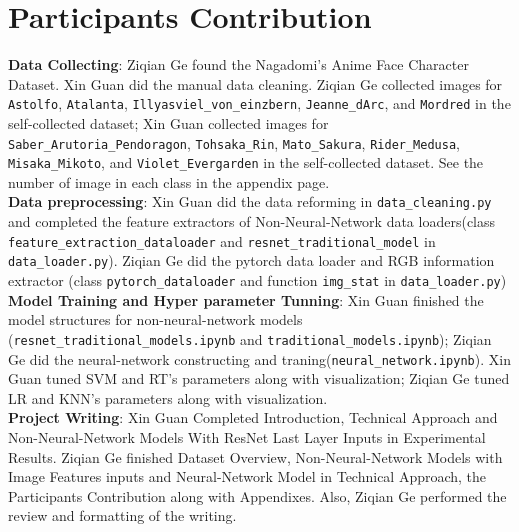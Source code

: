 \documentclass[11.5pt]{article}
\begin{document}
    \section{Participants Contribution}
    \textbf{Data Collecting}: Ziqian Ge found the Nagadomi's Anime Face Character Dataset. Xin Guan did the manual data cleaning. Ziqian Ge collected images for \texttt{Astolfo}, \texttt{Atalanta}, \texttt{Illyasviel\_von\_einzbern}, \texttt{Jeanne\_dArc}, and \texttt{Mordred} in the self-collected dataset; Xin Guan collected images for \texttt{Saber\_Arutoria\_Pendoragon}, \texttt{Tohsaka\_Rin}, \texttt{Mato\_Sakura}, \texttt{Rider\_Medusa}, \texttt{Misaka\_Mikoto}, and \texttt{Violet\_Evergarden} in the self-collected dataset. See the number of image in each class in the appendix page.\\
    \textbf{Data preprocessing}: Xin Guan did the data reforming in \texttt{data\_cleaning.py} and completed the feature extractors of Non-Neural-Network data loaders(class \texttt{feature\_extraction\_dataloader} and \texttt{resnet\_traditional\_model} in \texttt{data\_loader.py}). Ziqian Ge did the pytorch data loader and RGB information extractor (class \texttt{pytorch\_dataloader} and function \texttt{img\_stat} in \texttt{data\_loader.py}) \\
    \textbf{Model Training and Hyper parameter Tunning}: Xin Guan finished the model structures for non-neural-network models (\texttt{resnet\_traditional\_models.ipynb} and \texttt{traditional\_models.ipynb}); Ziqian Ge did the neural-network constructing and traning(\texttt{neural\_network.ipynb}). Xin Guan tuned SVM and RT's parameters along with visualization; Ziqian Ge tuned LR and KNN's parameters along with visualization. \\
    \textbf{Project Writing}: Xin Guan Completed Introduction, Technical Approach and Non-Neural-Network Models With ResNet Last Layer Inputs in Experimental Results. Ziqian Ge finished Dataset Overview, Non-Neural-Network Models with Image Features inputs and Neural-Network Model in Technical Approach, the Participants Contribution along with Appendixes. Also, Ziqian Ge performed the review and formatting of the writing.
    \vspace{10mm}
\end{document}
